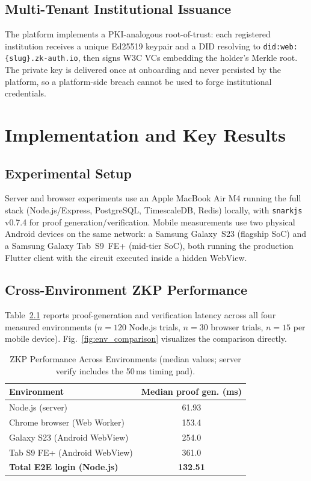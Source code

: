 \documentclass[12pt,a4paper,oneside]{report}
\begin{document}
\section{Multi-Tenant Institutional Issuance}

The platform implements a PKI-analogous root-of-trust: each registered
institution receives a unique Ed25519 keypair and a DID resolving to
\texttt{did:web:\{slug\}.zk-auth.io}, then signs W3C VCs embedding the
holder's Merkle root. The private key is delivered once at onboarding and
never persisted by the platform, so a platform-side breach cannot be used
to forge institutional credentials.

\chapter{Implementation and Key Results}

\section{Experimental Setup}

Server and browser experiments use an Apple MacBook Air M4 running the
full stack (Node.js/Express, PostgreSQL, TimescaleDB, Redis) locally, with
\texttt{snarkjs} v0.7.4 for proof generation/verification. Mobile
measurements use two physical Android devices on the same network: a
Samsung Galaxy~S23 (flagship SoC) and a Samsung Galaxy Tab~S9~FE+
(mid-tier SoC), both running the production Flutter client with the
circuit executed inside a hidden WebView.

\section{Cross-Environment ZKP Performance}

Table~\ref{tab:zkp_results} reports proof-generation and verification
latency across all four measured environments ($n=120$ Node.js trials,
$n=30$ browser trials, $n=15$ per mobile device). Fig.~\ref{fig:env_comparison}
visualizes the comparison directly.

\begin{table}[H]
\renewcommand{\arraystretch}{1.2}
\caption{ZKP Performance Across Environments (median values; server
verify includes the 50\,ms timing pad).}
\label{tab:zkp_results}
\centering
\small
\begin{tabular}{lc}
\toprule
\textbf{Environment} & \textbf{Median proof gen. (ms)} \\
\midrule
Node.js (server)              & 61.93 \\
Chrome browser (Web Worker)   & 153.4 \\
Galaxy S23 (Android WebView)  & 254.0 \\
Tab S9 FE+ (Android WebView)  & 361.0 \\
\midrule
\textbf{Total E2E login (Node.js)} & \textbf{132.51} \\
\bottomrule
\end{tabular}
\end{table}
\end{document}
